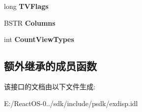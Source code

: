 \begin{DoxyCompactItemize}
long {\bfseries T\+V\+Flags}
\item 
\mbox{\label{interface_s_h_doc_vw_1_1_i_shell_name_space_a3252f03cf9d76f44dc8304d14722646b}} 
B\+S\+TR {\bfseries Columns}
\item 
\mbox{\label{interface_s_h_doc_vw_1_1_i_shell_name_space_a41af12c7feb1d16bc5350609b45678b5}} 
int {\bfseries Count\+View\+Types}
\end{DoxyCompactItemize}
\subsection*{额外继承的成员函数}


该接口的文档由以下文件生成\+:\begin{DoxyCompactItemize}
\item 
E\+:/\+React\+O\+S-\/0../sdk/include/psdk/exdisp.\+idl\end{DoxyCompactItemize}
